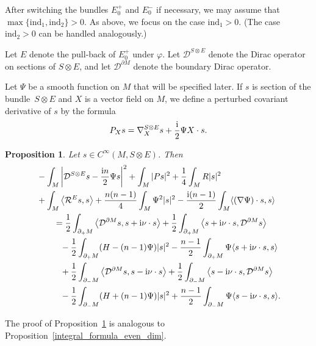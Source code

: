 \documentclass[11pt]{article}
\numberwithin{equation}{section}
\numberwithin{equation}{section}
\newtheorem{Proposition}[Theorem]{Proposition}
 { \theoremstyle{definition}
\newtheorem{Definition}[Theorem]{Definition}
\newtheorem{Note}[Theorem]{Note}
\newtheorem{Example}[Theorem]{Example}
\newtheorem{Remark}[Theorem]{Remark} }
\begin{document}
After switching the bundles $E_0^+$ and $E_0^-$ if necessary, we may assume that ${\max \{\mathrm{ind}_1,\mathrm{ind}_2\} \!> 0}$.
As above, we focus on the case $\mathrm{ind}_1 > 0$.
(The case $\mathrm{ind}_2 > 0$ can be handled analogously.)

Let $E$ denote the pull-back of $E_0^+$ under $\varphi$. Let $\mathcal{D}^{S \otimes E}$ denote the Dirac operator on sections of $S \otimes E$, and let $\mathcal{D}^{\partial M}$ denote the boundary Dirac operator.

Let $\Psi$ be a smooth function on $M$ that will be specified later. If $s$ is section of the bundle~${S \otimes E}$ and $X$ is a vector field on $M$, we define a perturbed covariant derivative of $s$ by the formula
\[
 P_X s = \nabla_{X}^{S \otimes E}s + \frac{\rm i}{2} \Psi X \cdot s.
\]

\begin{Proposition}
\label{integral_formula_odd_dim}
Let $s \in C^\infty(M,S \otimes E)$.
Then
\begin{align*}
&- \int_M \left|\mathcal{D}^{S \otimes E} s - \frac{{\rm i}n}{2} \Psi s\right|^2 + \int_M |Ps|^2 + \frac{1}{4} \int_M R |s|^2 \\
&+ \int_M \big\langle \mathcal{R}^E s,s \big\rangle + \frac{n(n-1)}{4} \int_M \Psi^2 |s|^2 - \frac{{\rm i}(n-1)}{2} \int_M \langle (\nabla \Psi) \cdot s,s \rangle \\
&\qquad= \frac{1}{2} \int_{\partial_+ M} \big\langle \mathcal{D}^{\partial M} s,s + {\rm i} \nu \cdot s \big\rangle + \frac{1}{2} \int_{\partial_+ M} \big\langle s + {\rm i} \nu \cdot s,\mathcal{D}^{\partial M} s \big\rangle \\
&\phantom{\qquad=}{} - \frac{1}{2} \int_{\partial_+ M} (H-(n-1)\Psi) |s|^2 - \frac{n-1}{2} \int_{\partial_+ M} \Psi \langle s + {\rm i} \nu \cdot s,s \rangle \\
&\phantom{\qquad=}{} + \frac{1}{2} \int_{\partial_- M} \big\langle \mathcal{D}^{\partial M} s,s - {\rm i} \nu \cdot s \big\rangle + \frac{1}{2} \int_{\partial_- M} \big\langle s - {\rm i} \nu \cdot s,\mathcal{D}^{\partial M} s \big\rangle \\
&\phantom{\qquad=}{} - \frac{1}{2} \int_{\partial_- M} (H+(n-1)\Psi) |s|^2 + \frac{n-1}{2} \int_{\partial_- M} \Psi \langle s - {\rm i} \nu \cdot s,s \rangle.
\end{align*}
\end{Proposition}

The proof of Proposition~\ref{integral_formula_odd_dim} is analogous to Proposition~\ref{integral_formula_even_dim}.
\end{document}
